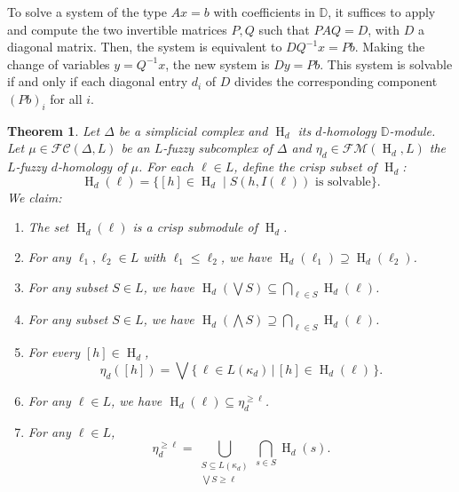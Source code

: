 \documentclass[a4paper,10pt]{article}
\newtheorem{theorem}{Theorem}[section]
\newcommand{\bbd}{\mathbb{D}}
\newcommand{\calfm}{\mathcal{F\!M}}
\newcommand{\calfc}{\mathcal{FC}}
\DeclareMathOperator{\Ho}{H}
\begin{document}
To solve a system of the type \(Ax=b\) with coefficients in \(\bbd\), it suffices to apply  and compute the two invertible matrices \(P,Q\) such that \(PAQ = D\), with \(D\) a diagonal matrix. Then, the system is equivalent to \(DQ^{-1}x = Pb\). Making the change of variables \(y = Q^{-1}x\), the new system is \(Dy = Pb\). This system is solvable if and only if each diagonal entry \(d_{i}\) of \(D\) divides the corresponding component \((Pb)_i\) for all \(i\). 

\begin{theorem}
\label{thm:hdl_properties}
Let \(\Delta\) be a simplicial complex and \(\Ho_d\) its \(d\)-homology \(\bbd\)-module. Let \(\mu \in \calfc(\Delta,L)\) be an \(L\)-fuzzy subcomplex of \(\Delta\) and \(\eta_d \in \calfm(\Ho_d,L)\) the \(L\)-fuzzy \(d\)-homology of \(\mu\). For each \(\ell \in L\),
define the crisp subset of \(\Ho_d\):
\[
\Ho_d(\ell) = \big\{[h] \in \Ho_d \mid S(h,I(\ell)) \text{ is solvable} \big\}.
\]
We claim:
\begin{enumerate}[label=(\roman*)]
\item \label{item:hdl_submodule} The set \(\Ho_d(\ell)\) is a crisp submodule of \(\Ho_d\).
\item \label{item:hdl_functor} For any \(\ell_1, \ell_2 \in L\) with \(\ell_1 \leq \ell_2\), we have \(\Ho_d(\ell_1) \supseteq \Ho_d(\ell_2)\).
\item \label{item:hdl_join} For any subset \(S \in L\), we have \(\Ho_d(\bigvee S)\subseteq \bigcap_{\ell \in S} \Ho_d(\ell)\).
\item \label{item:hdl_meet} For any subset \(S \in L\), we have \(\Ho_d(\bigwedge S)\supseteq \bigcap_{\ell \in S} \Ho_d(\ell)\).
\item \label{item:hdl_eta} For every \([h] \in \Ho_d\),
\[
\eta_d([h]) = \bigvee \Big\{\, \ell \in L(\kappa_d) \, \Big| \, [h] \in \Ho_d(\ell) \,\Big\}.
\]
\item \label{item:hdl_contain} For any \(\ell \in L\), we have \(\Ho_d(\ell) \subseteq \eta_d^{\geq \ell}\).
\item \label{item:hdl_cut} For any \(\ell \in L\),
\[
\eta_d^{\geq \ell}
= \bigcup_{\substack{S \subseteq L(\kappa_d) \\ \bigvee S \geq \ell}} \bigcap_{s \in S} \Ho_d(s).
\]
\end{enumerate}
\end{theorem}
\end{document}
